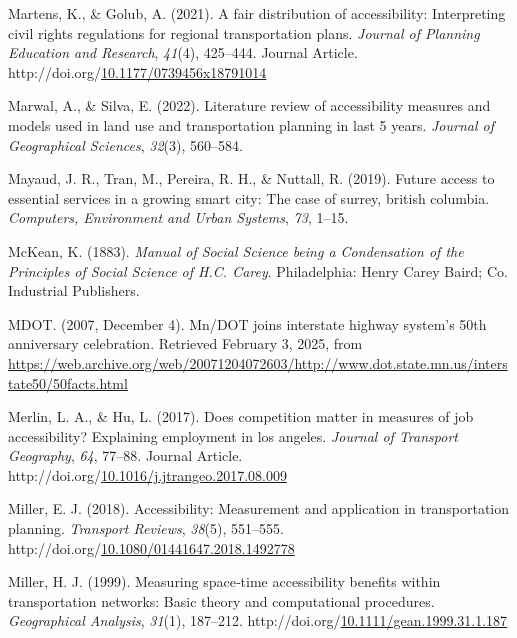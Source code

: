 \documentclass[
11pt, %
oneside, %
english, %
singlespacing, %
]{macthesis} %
\newlength{\cslhangindent}
\newenvironment{CSLReferences}[2] %
{\begin{list}{}{%
	\setlength{\itemindent}{0pt}
	\setlength{\leftmargin}{0pt}
	\setlength{\parsep}{0pt}
	\ifodd #1
	\setlength{\leftmargin}{\cslhangindent}
	\setlength{\itemindent}{-1\cslhangindent}
	\fi
	\setlength{\itemsep}{#2\baselineskip}}}
{\end{list}}
\begin{document}
\begin{CSLReferences}{1}{0}
Martens, K., \& Golub, A. (2021). A fair distribution of accessibility: Interpreting civil rights regulations for regional transportation plans. \emph{Journal of Planning Education and Research}, \emph{41}(4), 425--444. Journal Article. http://doi.org/\href{https://doi.org/10.1177/0739456x18791014}{10.1177/0739456x18791014}

Marwal, A., \& Silva, E. (2022). Literature review of accessibility measures and models used in land use and transportation planning in last 5 years. \emph{Journal of Geographical Sciences}, \emph{32}(3), 560--584.

Mayaud, J. R., Tran, M., Pereira, R. H., \& Nuttall, R. (2019). Future access to essential services in a growing smart city: The case of surrey, british columbia. \emph{Computers, Environment and Urban Systems}, \emph{73}, 1--15.

McKean, K. (1883). \emph{Manual of {Social} {Science} being a {Condensation} of the {Principles} of {Social} {Science} of {H}.{C}. {Carey}}. Philadelphia: Henry Carey Baird; Co. Industrial Publishers.

MDOT. (2007, December 4). Mn/{DOT} joins interstate highway system's 50th anniversary celebration. Retrieved February 3, 2025, from \url{https://web.archive.org/web/20071204072603/http://www.dot.state.mn.us/interstate50/50facts.html}

Merlin, L. A., \& Hu, L. (2017). Does competition matter in measures of job accessibility? Explaining employment in los angeles. \emph{Journal of Transport Geography}, \emph{64}, 77--88. Journal Article. http://doi.org/\href{https://doi.org/10.1016/j.jtrangeo.2017.08.009}{10.1016/j.jtrangeo.2017.08.009}

Miller, E. J. (2018). Accessibility: Measurement and application in transportation planning. \emph{Transport Reviews}, \emph{38}(5), 551--555. http://doi.org/\href{https://doi.org/10.1080/01441647.2018.1492778}{10.1080/01441647.2018.1492778}

Miller, H. J. (1999). Measuring space‐time accessibility benefits within transportation networks: Basic theory and computational procedures. \emph{Geographical Analysis}, \emph{31}(1), 187--212. http://doi.org/\href{https://doi.org/10.1111/gean.1999.31.1.187}{10.1111/gean.1999.31.1.187}


\end{CSLReferences}
\end{document}
